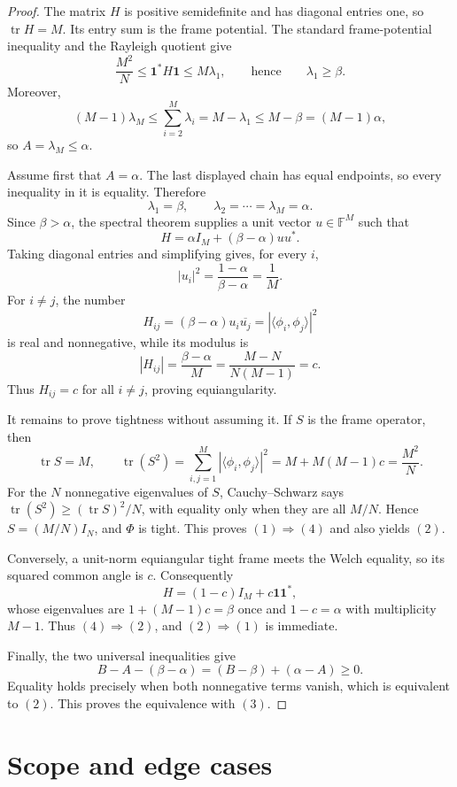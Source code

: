 \documentclass[11pt]{article}
\newcommand{\F}{\mathbb F}
\newcommand{\ip}[2]{\langle #1,#2\rangle}
\newcommand{\one}{\mathbf 1}
\begin{document}
\begin{proof}
The matrix $H$ is positive semidefinite and has diagonal entries one, so
$\operatorname{tr}H=M$.  Its entry sum is the frame potential.  The standard
frame-potential inequality and the Rayleigh quotient give
\[
 \frac{M^2}{N}
 \leq \one^*H\one
 \leq M\lambda_1,
 \qquad\text{hence}\qquad
 \lambda_1\geq\beta.
\]
Moreover,
\[
 (M-1)\lambda_M
 \leq\sum_{i=2}^M\lambda_i
 =M-\lambda_1
 \leq M-\beta=(M-1)\alpha,
\]
so $A=\lambda_M\leq\alpha$.

Assume first that $A=\alpha$.  The last displayed chain has equal endpoints,
so every inequality in it is equality.  Therefore
\[
 \lambda_1=\beta,
 \qquad
 \lambda_2=\cdots=\lambda_M=\alpha.
\]
Since $\beta>\alpha$, the spectral theorem supplies a unit vector
$u\in\F^M$ such that
\[
 H=\alpha I_M+(\beta-\alpha)uu^*.
\]
Taking diagonal entries and simplifying gives, for every $i$,
\[
 |u_i|^2=\frac{1-\alpha}{\beta-\alpha}=\frac1M.
\]
For $i\ne j$, the number
\[
 H_{ij}=(\beta-\alpha)u_i\overline{u_j}
       =|\ip{\phi_i}{\phi_j}|^2
\]
is real and nonnegative, while its modulus is
\[
 |H_{ij}|=\frac{\beta-\alpha}{M}
          =\frac{M-N}{N(M-1)}=c.
\]
Thus $H_{ij}=c$ for all $i\ne j$, proving equiangularity.

It remains to prove tightness without assuming it.  If $S$ is the frame
operator, then
\[
 \operatorname{tr}S=M,
 \qquad
 \operatorname{tr}(S^2)
   =\sum_{i,j=1}^M|\ip{\phi_i}{\phi_j}|^2
   =M+M(M-1)c=\frac{M^2}{N}.
\]
For the $N$ nonnegative eigenvalues of $S$, Cauchy--Schwarz says
$\operatorname{tr}(S^2)\geq(\operatorname{tr}S)^2/N$, with equality only
when they are all $M/N$.  Hence $S=(M/N)I_N$, and $\Phi$ is tight.  This
proves $(1)\Rightarrow(4)$ and also yields $(2)$.

Conversely, a unit-norm equiangular tight frame meets the Welch equality, so
its squared common angle is $c$.  Consequently
\[
 H=(1-c)I_M+c\one\one^*,
\]
whose eigenvalues are $1+(M-1)c=\beta$ once and
$1-c=\alpha$ with multiplicity $M-1$.  Thus $(4)\Rightarrow(2)$, and
$(2)\Rightarrow(1)$ is immediate.

Finally, the two universal inequalities give
\[
 B-A-(\beta-\alpha)=(B-\beta)+(\alpha-A)\geq0.
\]
Equality holds precisely when both nonnegative terms vanish, which is
equivalent to $(2)$.  This proves the equivalence with $(3)$.
\end{proof}

\section{Scope and edge cases}
\end{document}

